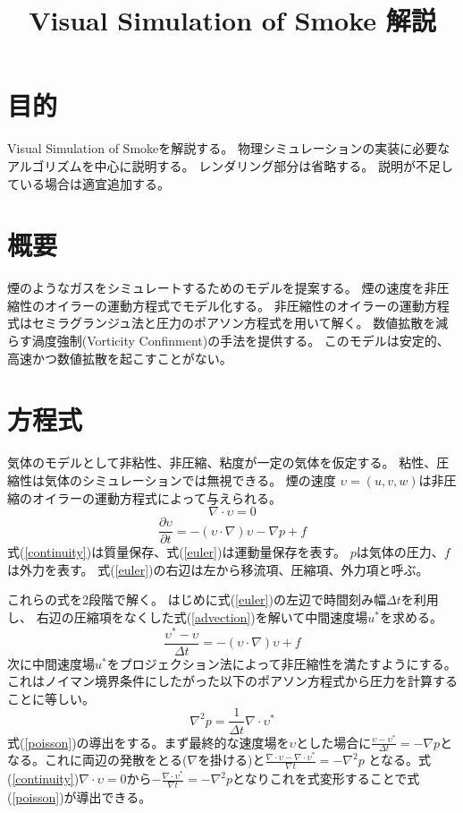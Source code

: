 \documentclass{ujarticle}
\title{Visual Simulation of Smoke 解説}
\begin{document}
\maketitle
\section{目的}
Visual Simulation of Smoke\cite{Fedkiw2001}を解説する。
物理シミュレーションの実装に必要なアルゴリズムを中心に説明する。
レンダリング部分は省略する。
説明が不足している場合は適宜追加する。
\section{概要}
煙のようなガスをシミュレートするためのモデルを提案する。
煙の速度を非圧縮性のオイラーの運動方程式でモデル化する。
非圧縮性のオイラーの運動方程式はセミラグランジュ法と圧力のポアソン方程式を用いて解く。
数値拡散を減らす渦度強制(Vorticity Confinment)の手法を提供する。
このモデルは安定的、高速かつ数値拡散を起こすことがない。
\section{方程式}

気体のモデルとして非粘性、非圧縮、粘度が一定の気体を仮定する。
粘性、圧縮性は気体のシミュレーションでは無視できる。
煙の速度 $\upsilon = (u,v,w)$は非圧縮のオイラーの運動方程式によって与えられる。
\begin{equation}
\label{continuity}
\nabla \cdot \upsilon = 0
\end{equation}
\begin{equation}
\label{euler}
\frac{\partial \upsilon}{\partial t} = -(\upsilon \cdot \nabla)\upsilon - \nabla p + f
\end{equation}
式(\ref{continuity})は質量保存、式(\ref{euler})は運動量保存を表す。
$p$は気体の圧力、$f$は外力を表す。
式(\ref{euler})の右辺は左から移流項、圧縮項、外力項と呼ぶ。

これらの式を2段階で解く。
はじめに式(\ref{euler})の左辺で時間刻み幅$\Delta t$を利用し、
右辺の圧縮項をなくした式(\ref{advection})を解いて中間速度場$u^*$を求める。
\begin{equation}
\label{advection}
\frac{\upsilon^* - \upsilon}{\Delta t} = -(\upsilon \cdot \nabla)\upsilon + f
\end{equation}
次に中間速度場$u^*$をプロジェクション法によって非圧縮性を満たすようにする。
これはノイマン境界条件にしたがった以下のポアソン方程式から圧力を計算することに等しい。
\begin{equation}
\label{poisson}
\nabla^2 p = \frac{1}{\Delta t} \nabla \cdot \upsilon^*
\end{equation}
式(\ref{poisson})の導出をする。まず最終的な速度場を$\upsilon$とした場合に$\frac{\upsilon - \upsilon^* }{\Delta t} = - \nabla p$となる。これに両辺の発散をとる($\nabla$を掛ける)と$\frac{\nabla \cdot \upsilon - \nabla \cdot \upsilon^*}{\nabla t} = - \nabla^2 p$ となる。式(\ref{continuity})$\nabla \cdot \upsilon = 0$から$- \frac{\nabla \cdot \upsilon^*}{\nabla t} = - \nabla^2 p$となりこれを式変形することで式(\ref{poisson})が導出できる。
\end{document}
